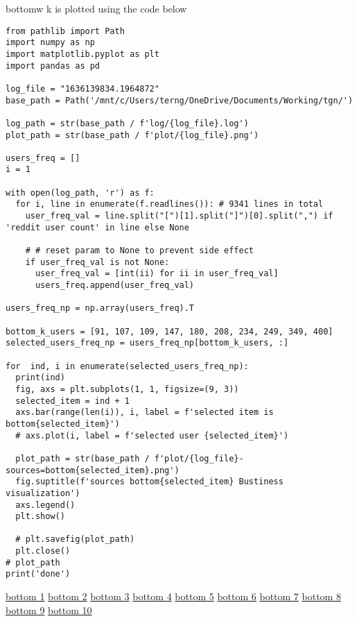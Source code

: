 \documentclass[11pt]{article}
\begin{document}
bottomw k is plotted using the code below
\begin{verbatim}
from pathlib import Path
import numpy as np
import matplotlib.pyplot as plt
import pandas as pd

log_file = "1636139834.1964872"
base_path = Path('/mnt/c/Users/terng/OneDrive/Documents/Working/tgn/')

log_path = str(base_path / f'log/{log_file}.log')
plot_path = str(base_path / f'plot/{log_file}.png')

users_freq = []
i = 1

with open(log_path, 'r') as f:
  for i, line in enumerate(f.readlines()): # 9341 lines in total
    user_freq_val = line.split("[")[1].split("]")[0].split(",") if 'reddit user count' in line else None

    # # reset param to None to prevent side effect
    if user_freq_val is not None:
      user_freq_val = [int(ii) for ii in user_freq_val]
      users_freq.append(user_freq_val)

users_freq_np = np.array(users_freq).T

bottom_k_users = [91, 107, 109, 147, 180, 208, 234, 249, 349, 400]
selected_users_freq_np = users_freq_np[bottom_k_users, :]

for  ind, i in enumerate(selected_users_freq_np):
  print(ind)
  fig, axs = plt.subplots(1, 1, figsize=(9, 3))
  selected_item = ind + 1
  axs.bar(range(len(i)), i, label = f'selected item is bottom{selected_item}')
  # axs.plot(i, label = f'selected user {selected_item}')

  plot_path = str(base_path / f'plot/{log_file}-sources=bottom{selected_item}.png')
  fig.suptitle(f'sources bottom{selected_item} Bustiness visualization')
  axs.legend()
  plt.show()

  # plt.savefig(plot_path)
  plt.close()
# plot_path
print('done')

\end{verbatim}

\href{file:///mnt/c/Users/terng/OneDrive/Documents/Working/tgn/plot/1636139834.1964872-sources=bottom1.png}{bottom 1}
\href{file:///mnt/c/Users/terng/OneDrive/Documents/Working/tgn/plot/1636139834.1964872-sources=bottom2.png}{bottom 2}
\href{file:///mnt/c/Users/terng/OneDrive/Documents/Working/tgn/plot/1636139834.1964872-sources=bottom3.png}{bottom 3}
\href{file:///mnt/c/Users/terng/OneDrive/Documents/Working/tgn/plot/1636139834.1964872-sources=bottom4.png}{bottom 4}
\href{file:///mnt/c/Users/terng/OneDrive/Documents/Working/tgn/plot/1636139834.1964872-sources=bottom5.png}{bottom 5}
\href{file:///mnt/c/Users/terng/OneDrive/Documents/Working/tgn/plot/1636139834.1964872-sources=bottom6.png}{bottom 6}
\href{file:///mnt/c/Users/terng/OneDrive/Documents/Working/tgn/plot/1636139834.1964872-sources=bottom7.png}{bottom 7}
\href{file:///mnt/c/Users/terng/OneDrive/Documents/Working/tgn/plot/1636139834.1964872-sources=bottom8.png}{bottom 8}
\href{file:///mnt/c/Users/terng/OneDrive/Documents/Working/tgn/plot/1636139834.1964872-sources=bottom9.png}{bottom 9}
\href{file:///mnt/c/Users/terng/OneDrive/Documents/Working/tgn/plot/1636139834.1964872-sources=bottom10.png}{bottom 10}
\end{document}
